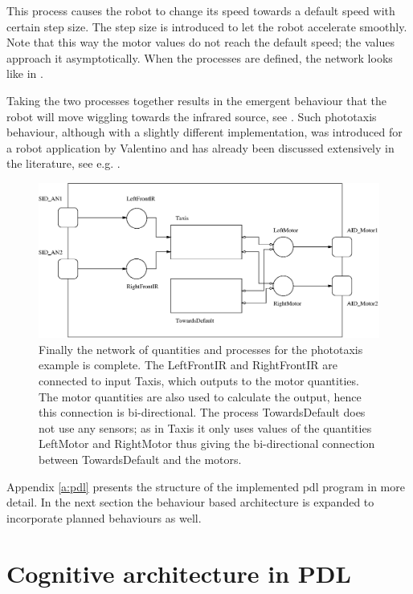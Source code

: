 This process causes the robot to change its speed towards a default speed with certain step size. The step size is introduced to let the robot accelerate smoothly. Note that this way the motor values do not reach the default speed; the values approach it asymptotically. When the processes are defined, the network looks like in .

Taking the two processes together results in the emergent behaviour that the robot will move wiggling towards the infrared source, see . Such phototaxis behaviour, although with a slightly different implementation, was introduced for a robot application by Valentino \citet{braitenberg:1984} and has already been discussed extensively in the literature, see e.g. \citealt{steels:1994}.

\begin{figure}
\centerline{\includegraphics[width=12cm]{robots//pdl_network.eps}}
\caption{Finally the network of quantities and processes for the phototaxis example is complete. The LeftFrontIR and RightFrontIR are connected to input Taxis, which outputs to the motor quantities. The motor quantities are also used to calculate the output, hence this connection is bi-directional. The process TowardsDefault does not use any sensors; as in Taxis it only uses values of the quantities LeftMotor and RightMotor thus giving the bi-directional connection between TowardsDefault and the motors.}
\label{f:robots:pdl}
\end{figure}

Appendix \ref{a:pdl} presents the structure of the implemented {\sc pdl} program in more detail. In the next section the behaviour based architecture is expanded to incorporate planned behaviours as well.


\section{Cognitive architecture in PDL}\label{s:robots:architecture}
	
